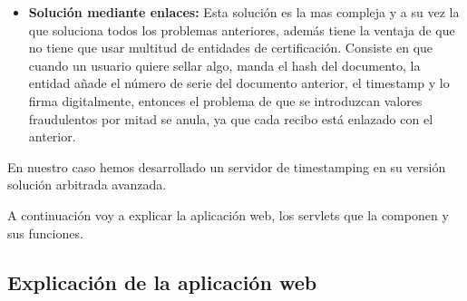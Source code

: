\begin{itemize}
\item \textbf{Solución mediante enlaces:} Esta solución es la mas compleja y a su vez la que soluciona todos los problemas anteriores, además tiene la ventaja de que no tiene que usar multitud de entidades de certificación. Consiste en que cuando un usuario quiere sellar algo, manda el hash del documento, la entidad añade el número de serie del documento anterior, el timestamp y lo firma digitalmente, entonces el problema de que se introduzcan valores fraudulentos por mitad se anula, ya que cada recibo está enlazado con el anterior.
\end{itemize}

En nuestro caso hemos desarrollado un servidor de timestamping en su versión solución arbitrada avanzada.

A continuación voy a explicar la aplicación web, los servlets que la componen y sus funciones.

\subsection{Explicación de la aplicación web\label{ref_explicación_server_timestamp_google_app_engine}}


